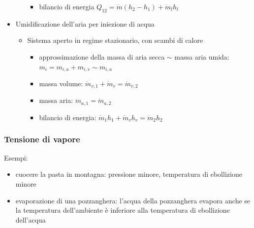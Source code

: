 \documentclass[letterpaper,10pt,italian]{jupyterBook}
\begin{document}
\begin{itemize}
\begin{itemize}
\begin{itemize}
\item {} 
\sphinxAtStartPar
bilancio di energia \(Q_{12} = \dot{m}(h_2 - h_1) + \dot{m}_l h_l\)

\end{itemize}

\end{itemize}

\item {} 
\sphinxAtStartPar
Umidificazione dell’aria per iniezione di acqua
\begin{itemize}
\item {} 
\sphinxAtStartPar
Sistema aperto in regime stazionario, con scambi di calore
\begin{itemize}
\item {} 
\sphinxAtStartPar
approssimazione della massa di aria secca \(\sim\) massa aria umida: \(m_{i} = m_{i,a} + m_{i,v} \sim m_{i,a}\)

\item {} 
\sphinxAtStartPar
massa volume: \(\dot{m}_{v,1} + \dot{m}_v = \dot{m}_{v,2}\)

\item {} 
\sphinxAtStartPar
massa aria: \(\dot{m}_{a,1} = \dot{m}_{a,2}\)

\item {} 
\sphinxAtStartPar
bilancio di energia: \(\dot{m}_{1} h_1 + \dot{m}_v h_v = \dot{m}_2 h_2\)

\end{itemize}

\end{itemize}

\end{itemize}


\subsubsection{Tensione di vapore}
\label{\detokenize{ch/thermodynamics/humid-air:tensione-di-vapore}}\label{\detokenize{ch/thermodynamics/humid-air:physics-hs-thermodynamics-matter-humid-air-vapor-pressure}}
\sphinxAtStartPar
Esempi:
\begin{itemize}
\item {} 
\sphinxAtStartPar
cuocere la pasta in montagna: pressione minore, temperatura di ebollizione minore

\item {} 
\sphinxAtStartPar
evaporazione di una pozzanghera: l’acqua della pozzanghera evapora anche se la temperatura dell’ambiente è inferiore alla temperatura di ebollizione dell’acqua

\end{itemize}
\end{document}
